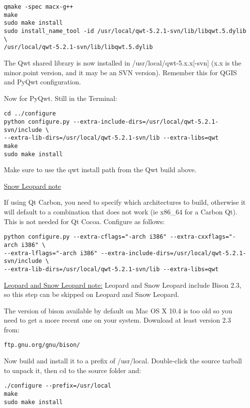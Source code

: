 \begin{verbatim}
qmake -spec macx-g++
make
sudo make install
sudo install_name_tool -id /usr/local/qwt-5.2.1-svn/lib/libqwt.5.dylib \
/usr/local/qwt-5.2.1-svn/lib/libqwt.5.dylib
\end{verbatim}

The Qwt shared library is now installed in /usr/local/qwt-5.x.x[-svn] (x.x is the 
minor.point version, and it may be an SVN version).  Remember this for QGIS and PyQwt configuration.

Now for PyQwt.  Still in the Terminal:

\begin{verbatim}
cd ../configure
python configure.py --extra-include-dirs=/usr/local/qwt-5.2.1-svn/include \
--extra-lib-dirs=/usr/local/qwt-5.2.1-svn/lib --extra-libs=qwt
make
sudo make install
\end{verbatim}

Make sure to use the qwt install path from the Qwt build above.

\underline{Snow Leopard note}

If using Qt Carbon, you need to specify which architectures to build, otherwise
it will default to a combination that does not work (ie x86\_64 for a Carbon Qt).
This is not needed for Qt Cocoa. Configure as follows:

\begin{verbatim}
python configure.py --extra-cflags="-arch i386" --extra-cxxflags="-arch i386" \
--extra-lflags="-arch i386" --extra-include-dirs=/usr/local/qwt-5.2.1-svn/include \
--extra-lib-dirs=/usr/local/qwt-5.2.1-svn/lib --extra-libs=qwt
\end{verbatim}

\minisec{Additional Dependencies: Bison}
\underline{Leopard and Snow Leopard note:} Leopard and Snow Leopard include Bison 2.3, so this step can be skipped on Leopard and Snow Leopard.

The version of bison available by default on Mac OS X 10.4 is too old so you need to
get a more recent one on your system. Download at least version 2.3 from:

\begin{verbatim}
ftp.gnu.org/gnu/bison/
\end{verbatim}

Now build and install it to a prefix of /usr/local. Double-click the source
tarball to unpack it, then cd to the source folder and:

\begin{verbatim}
./configure --prefix=/usr/local 
make
sudo make install 
\end{verbatim}

